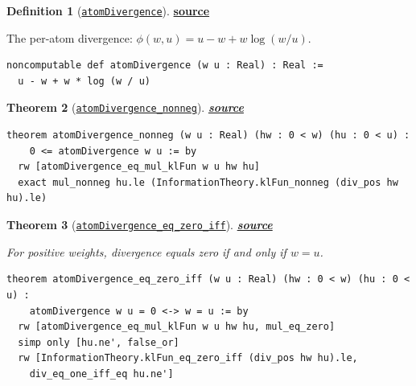 \documentclass[11pt]{article}
\newtheorem{theorem}{Theorem}[section]
\theoremstyle{definition}
\newtheorem{definition}[theorem]{Definition}
\theoremstyle{remark}
\begin{document}
\begin{definition}[\href{https://github.com/zariuq/ks-foundations-of-inference/blob/main/KnuthSkilling/Information/Divergence.lean}{\texttt{atomDivergence}}]
\textbf{\href{https://github.com/zariuq/ks-foundations-of-inference/blob/main/KnuthSkilling/Information/Divergence.lean}{source}}

The per-atom divergence: $\phi(w, u) = u - w + w \log(w/u)$.
\end{definition}

\begin{lstlisting}[caption={Atom divergence}]
noncomputable def atomDivergence (w u : Real) : Real :=
  u - w + w * log (w / u)
\end{lstlisting}

\begin{theorem}[\href{https://github.com/zariuq/ks-foundations-of-inference/blob/main/KnuthSkilling/Information/Divergence.lean}{\texttt{atomDivergence\_nonneg}}]
\textbf{\href{https://github.com/zariuq/ks-foundations-of-inference/blob/main/KnuthSkilling/Information/Divergence.lean}{source}}
\end{theorem}

\begin{lstlisting}[caption={Divergence non-negativity}]
theorem atomDivergence_nonneg (w u : Real) (hw : 0 < w) (hu : 0 < u) :
    0 <= atomDivergence w u := by
  rw [atomDivergence_eq_mul_klFun w u hw hu]
  exact mul_nonneg hu.le (InformationTheory.klFun_nonneg (div_pos hw hu).le)
\end{lstlisting}

\begin{theorem}[\href{https://github.com/zariuq/ks-foundations-of-inference/blob/main/KnuthSkilling/Information/Divergence.lean}{\texttt{atomDivergence\_eq\_zero\_iff}}]
\textbf{\href{https://github.com/zariuq/ks-foundations-of-inference/blob/main/KnuthSkilling/Information/Divergence.lean}{source}}

For positive weights, divergence equals zero if and only if $w = u$.
\end{theorem}

\begin{lstlisting}[caption={Divergence equals zero iff $w = u$ (\href{https://github.com/zariuq/ks-foundations-of-inference/blob/main/KnuthSkilling/Information/Divergence.lean}{Divergence.lean})},numbers=none]
theorem atomDivergence_eq_zero_iff (w u : Real) (hw : 0 < w) (hu : 0 < u) :
    atomDivergence w u = 0 <-> w = u := by
  rw [atomDivergence_eq_mul_klFun w u hw hu, mul_eq_zero]
  simp only [hu.ne', false_or]
  rw [InformationTheory.klFun_eq_zero_iff (div_pos hw hu).le,
    div_eq_one_iff_eq hu.ne']
\end{lstlisting}
\end{document}
